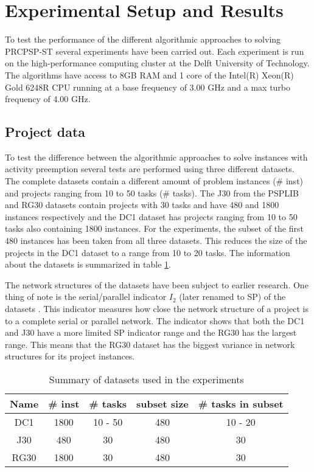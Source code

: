 \section{Experimental Setup and Results} \label{section:experimental_setup}
To test the performance of the different algorithmic approaches to solving PRCPSP-ST several experiments have been carried out.
Each experiment is run on the high-performance computing cluster at the Delft University of Technology. The algorithms have access to 8GB RAM and 1 core of the Intel(R) Xeon(R) Gold 6248R CPU running at a base frequency of 3.00 GHz and a max turbo frequency of 4.00 GHz.

\subsection{Project data}
To test the difference between the algorithmic approaches to solve instances with activity preemption several tests are performed using three different datasets. The complete datasets contain a different amount of problem instances (\# inst) and projects ranging from 10 to 50 tasks (\# tasks). The J30 from the PSPLIB \cite{RN25} and RG30 datasets contain projects with 30 tasks and have 480 and 1800 instances respectively and the DC1 dataset has projects ranging from 10 to 50 tasks also containing 1800 instances. For the experiments, the subset of the first 480 instances has been taken from all three datasets. This reduces the size of the projects in the DC1 dataset to a range from 10 to 20 tasks. The information about the datasets is summarized in table \ref{table:table1}.

The network structures of the datasets have been subject to earlier research. One thing of note is the serial/parallel indicator \(I_2\) (later renamed to SP) of the datasets \cite{RN65, RN63}. This indicator measures how close the network structure of a project is to a complete serial or parallel network. The indicator shows that both the DC1 and J30 have a more limited SP indicator range and the RG30 has the largest range. This means that the RG30 dataset has the biggest variance in network structures for its project instances.

\begin{table}
	\begin{center}
		\caption{Summary of datasets used in the experiments}
		\label{table:table1}
		\begin{tabular}{ c | c c c c }
			Name & \# inst & \# tasks & subset size & \# tasks in subset \\
			\hline
			DC1 & 1800 & 10 - 50 & 480 & 10 - 20 \\
			J30 & 480 & 30 & 480 & 30 \\
			RG30 & 1800 & 30 & 480 & 30
		\end{tabular}
	\end{center}
\end{table}

